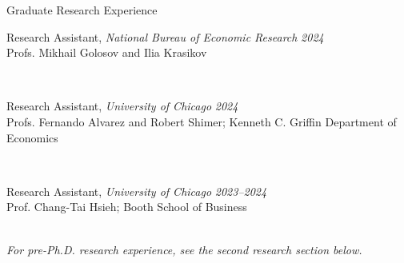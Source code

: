 \documentclass{resume} %
\begin{document}
		\begin{rSection}{Graduate Research Experience}
			\parbox{\linewidth}{Research Assistant, \textit{National Bureau of Economic Research} \hfill {\em 2024}\\[-0.25em]
			{\small Profs. Mikhail Golosov and Ilia Krasikov}}\\[0.35em]

			\parbox{\linewidth}{Research Assistant, \textit{University of Chicago} \hfill {\em 2024}\\[-0.25em]
			{\small Profs. Fernando Alvarez and Robert Shimer; Kenneth C. Griffin Department of Economics}}\\[0.35em]

			\parbox{\linewidth}{Research Assistant, \textit{University of Chicago} \hfill {\em 2023--2024}\\[-0.25em]
			{\small Prof. Chang-Tai Hsieh; Booth School of Business}}\\[0.5em]

			{\small\textit{For pre-Ph.D. research experience, see the second research section below.}}

	\end{rSection}
\end{document}
